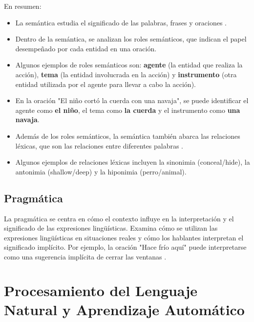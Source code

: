 \documentclass{book}
\begin{document}
En resumen:
\begin{itemize}
\item La semántica estudia el significado de las palabras, frases y oraciones \cite{JohnsonMLSS}.
\item Dentro de la semántica, se analizan los roles semánticos, que indican el papel desempeñado por cada entidad en una oración.
\item Algunos ejemplos de roles semánticos son: \textcolor[rgb]{0.00,0.00,1.00}{\textbf{agente}} (la entidad que realiza la acción), \textcolor[rgb]{1.00,0.00,0.00}{\textbf{tema}} (la entidad involucrada en la acción) y \textcolor[rgb]{0.00,1.00,0.00}{\textbf{instrumento}} (otra entidad utilizada por el agente para llevar a cabo la acción).
\item En la oración "El niño cortó la cuerda con una navaja", se puede identificar el agente como \textcolor[rgb]{0.00,0.00,1.00}{\textbf{el niño}}, el tema como \textcolor[rgb]{1.00,0.00,0.00}{\textbf{la cuerda}} y el instrumento como \textcolor[rgb]{0.00,1.00,0.00}{\textbf{una navaja}}.
\item Además de los roles semánticos, la semántica también abarca las relaciones léxicas, que son las relaciones entre diferentes palabras \cite{yule2016study}.
\item Algunos ejemplos de relaciones léxicas incluyen la sinonimia (conceal/hide), la antonimia (shallow/deep) y la hiponimia (perro/animal).
\end{itemize}


\subsection{Pragmática}

La pragmática se centra en cómo el contexto influye en la interpretación y el significado de las expresiones lingüísticas. Examina cómo se utilizan las expresiones lingüísticas en situaciones reales y cómo los hablantes interpretan el significado implícito. Por ejemplo, la oración "Hace frío aquí" puede interpretarse como una sugerencia implícita de cerrar las ventanas \cite{fromkin2018introduction}.


\section{Procesamiento del Lenguaje Natural y Aprendizaje Automático}
\end{document}
